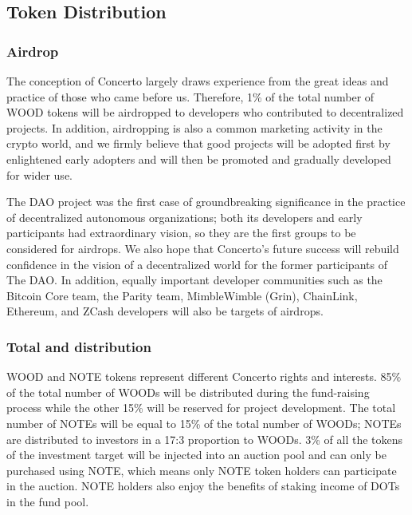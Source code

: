 \documentclass[UTF8]{article}
\begin{document}
\begin{multicols}{2}
\subsection{Token Distribution}
\subsubsection{Airdrop}

The conception of Concerto largely draws experience from the great ideas and practice of those who came before us. Therefore, 1\% of the total number of WOOD tokens will be airdropped to developers who contributed to decentralized projects. In addition, airdropping is also a common marketing activity in the crypto world, and we firmly believe that good projects will be adopted first by enlightened early adopters and will then be promoted and gradually developed for wider use.

The DAO project was the first case of groundbreaking significance in the practice of decentralized autonomous organizations; both its developers and early participants had extraordinary vision, so they are the first groups to be considered for airdrops. We also hope that Concerto’s future success will rebuild confidence in the vision of a decentralized world for the former participants of The DAO. In addition, equally important developer communities such as the Bitcoin Core team, the Parity team, MimbleWimble (Grin), ChainLink, Ethereum, and ZCash developers will also be targets of airdrops.

\subsubsection{Total and distribution}

WOOD and NOTE tokens represent different Concerto rights and interests.
85\% of the total number of WOODs will be distributed during the fund-raising process while the other 15\% will be reserved for project development. The total number of NOTEs will be equal to 15\% of the total number of WOODs; NOTEs are distributed to investors in a 17:3 proportion to WOODs. 3\% of all the tokens of the investment target will be injected into an auction pool and can only be purchased using NOTE, which means only NOTE token holders can participate in the auction. NOTE holders also enjoy the benefits of staking income of DOTs in the fund pool.


\end{multicols}
\end{document}
